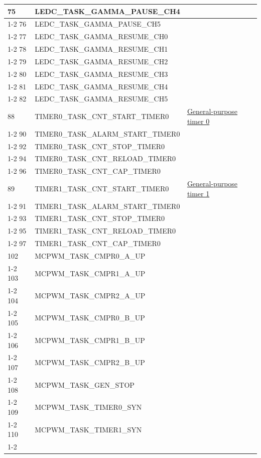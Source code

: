 \documentclass[main\_\_EN.tex]{subfiles}
\begin{document}
\begin{longtable}{ | l | l | l | }
75  & LEDC\_TASK\_GAMMA\_PAUSE\_CH4 & \\ \cline{1-2}
76  & LEDC\_TASK\_GAMMA\_PAUSE\_CH5 & \\ \cline{1-2}
77  & LEDC\_TASK\_GAMMA\_RESUME\_CH0& \\ \cline{1-2}
78  & LEDC\_TASK\_GAMMA\_RESUME\_CH1& \\ \cline{1-2}
79  & LEDC\_TASK\_GAMMA\_RESUME\_CH2& \\ \cline{1-2}
80  & LEDC\_TASK\_GAMMA\_RESUME\_CH3& \\ \cline{1-2}
81  & LEDC\_TASK\_GAMMA\_RESUME\_CH4& \\ \cline{1-2}
82  & LEDC\_TASK\_GAMMA\_RESUME\_CH5& \\ \hline
88  & TIMER0\_TASK\_CNT\_START\_TIMER0     & \hyperref[mod:timg]{General-purpose timer 0}\\ \cline{1-2}
90  & TIMER0\_TASK\_ALARM\_START\_TIMER0   & \\ \cline{1-2}
92  & TIMER0\_TASK\_CNT\_STOP\_TIMER0      & \\ \cline{1-2}
94  & TIMER0\_TASK\_CNT\_RELOAD\_TIMER0    & \\ \cline{1-2}
96  & TIMER0\_TASK\_CNT\_CAP\_TIMER0& \\ \hline
89  & TIMER1\_TASK\_CNT\_START\_TIMER0     & \hyperref[mod:timg]{General-purpose timer 1}\\ \cline{1-2}
91  & TIMER1\_TASK\_ALARM\_START\_TIMER0   & \\ \cline{1-2}
93  & TIMER1\_TASK\_CNT\_STOP\_TIMER0      & \\ \cline{1-2}
95  & TIMER1\_TASK\_CNT\_RELOAD\_TIMER0    & \\ \cline{1-2}
97  & TIMER1\_TASK\_CNT\_CAP\_TIMER0& \\ \hline
102 & MCPWM\_TASK\_CMPR0\_A\_UP& \nameref{mod:mcpwm}\\ \cline{1-2}
103 & MCPWM\_TASK\_CMPR1\_A\_UP& \\ \cline{1-2}
104 & MCPWM\_TASK\_CMPR2\_A\_UP& \\ \cline{1-2}
105 & MCPWM\_TASK\_CMPR0\_B\_UP& \\ \cline{1-2}
106 & MCPWM\_TASK\_CMPR1\_B\_UP& \\ \cline{1-2}
107 & MCPWM\_TASK\_CMPR2\_B\_UP& \\ \cline{1-2}
108 & MCPWM\_TASK\_GEN\_STOP & \\ \cline{1-2}
109 & MCPWM\_TASK\_TIMER0\_SYN & \\ \cline{1-2}
110 & MCPWM\_TASK\_TIMER1\_SYN & \\ \cline{1-2}

\end{longtable}
\end{document}
